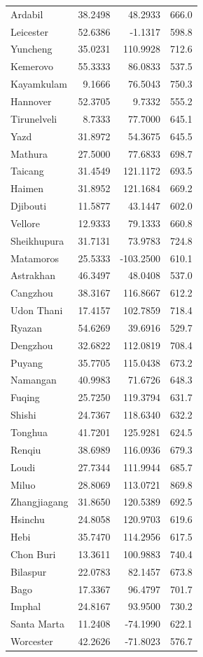 \begin{longtable}{lrrc}
Ardabil & 38.2498 & 48.2933 & 666.0 \\
Leicester & 52.6386 & -1.1317 & 598.8 \\
Yuncheng & 35.0231 & 110.9928 & 712.6 \\
Kemerovo & 55.3333 & 86.0833 & 537.5 \\
Kayamkulam & 9.1666 & 76.5043 & 750.3 \\
Hannover & 52.3705 & 9.7332 & 555.2 \\
Tirunelveli & 8.7333 & 77.7000 & 645.1 \\
Yazd & 31.8972 & 54.3675 & 645.5 \\
Mathura & 27.5000 & 77.6833 & 698.7 \\
Taicang & 31.4549 & 121.1172 & 693.5 \\
Haimen & 31.8952 & 121.1684 & 669.2 \\
Djibouti & 11.5877 & 43.1447 & 602.0 \\
Vellore & 12.9333 & 79.1333 & 660.8 \\
Sheikhupura & 31.7131 & 73.9783 & 724.8 \\
Matamoros & 25.5333 & -103.2500 & 610.1 \\
Astrakhan & 46.3497 & 48.0408 & 537.0 \\
Cangzhou & 38.3167 & 116.8667 & 612.2 \\
Udon Thani & 17.4157 & 102.7859 & 718.4 \\
Ryazan & 54.6269 & 39.6916 & 529.7 \\
Dengzhou & 32.6822 & 112.0819 & 708.4 \\
Puyang & 35.7705 & 115.0438 & 673.2 \\
Namangan & 40.9983 & 71.6726 & 648.3 \\
Fuqing & 25.7250 & 119.3794 & 631.7 \\
Shishi & 24.7367 & 118.6340 & 632.2 \\
Tonghua & 41.7201 & 125.9281 & 624.5 \\
Renqiu & 38.6989 & 116.0936 & 679.3 \\
Loudi & 27.7344 & 111.9944 & 685.7 \\
Miluo & 28.8069 & 113.0721 & 869.8 \\
Zhangjiagang & 31.8650 & 120.5389 & 692.5 \\
Hsinchu & 24.8058 & 120.9703 & 619.6 \\
Hebi & 35.7470 & 114.2956 & 617.5 \\
Chon Buri & 13.3611 & 100.9883 & 740.4 \\
Bilaspur & 22.0783 & 82.1457 & 673.8 \\
Bago & 17.3367 & 96.4797 & 701.7 \\
Imphal & 24.8167 & 93.9500 & 730.2 \\
Santa Marta & 11.2408 & -74.1990 & 622.1 \\
Worcester & 42.2626 & -71.8023 & 576.7 \\
\end{longtable}
